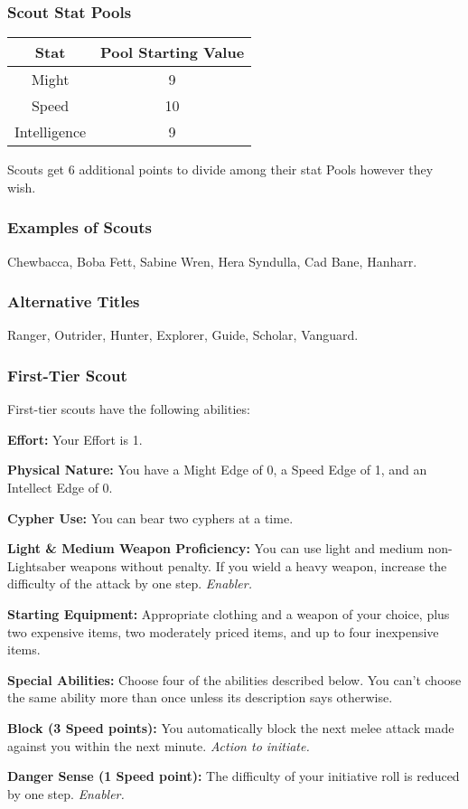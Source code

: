 \documentclass[a4paper,10pt,final,twocolumn,oneside]{book}
\newcommand{\statPool}[5]
{
	\subsubsection*{#1 Stat Pools}
	\label{subsub:#1StatPools}
	\begin{center}
	\begin{tabular}{ |c|c| }
	\hline
	\textbf{Stat} & \textbf{Pool Starting Value} \\
	\hline \hline
	Might & #2 \\
	\hline
 	Speed & #3  \\
 	\hline
 	Intelligence & #4  \\
 	\hline
	\end{tabular}
	\end{center}
	#1s get #5 additional points to divide among their stat Pools however they wish.
}
\newcommand{\itemLine}[2]{\textbf{#1:}{ #2}\par}
\newcommand{\itemAbility}[2]{\textcolor{25gray}{\textbullet\textbf{ #1:}}{ #2}\par}
\newcommand{\enabler}{\textit{ Enabler.}}
\newcommand{\actionInit}{\textit{ Action to initiate.}}
\begin{document}
\statPool{Scout}{9}{10}{9}{6}

\subsubsection*{Examples of Scouts}
\label{subsub:scoutExamples}

Chewbacca, Boba Fett, Sabine Wren, Hera Syndulla, Cad Bane, Hanharr.

\subsubsection*{Alternative Titles}
\label{subsub:scoutAlternative}

Ranger, Outrider, Hunter, Explorer, Guide, Scholar, Vanguard.


\subsubsection*{First-Tier Scout}
\label{subsub:scoutFirstTier}

First-tier scouts have the following abilities: \par

\itemLine{Effort}{Your Effort is 1.}

\itemLine{Physical Nature}{You have a Might Edge of 0, a Speed Edge of 1, and an Intellect Edge of 0.}

\itemLine{Cypher Use}{You can bear two cyphers at a time.}

\itemLine{Light \& Medium Weapon Proficiency}{You can use light and medium non-Lightsaber weapons without penalty. If you wield a heavy weapon, increase the difficulty of the attack by one step.\enabler}

\itemLine{Starting Equipment}{Appropriate clothing and a weapon of your choice, plus two expensive items, two moderately priced items, and up to four inexpensive items.}

\itemLine{Special Abilities}{Choose four of the abilities described below. You can’t choose the same ability more than once unless its description says otherwise.}

\itemAbility{Block (3 Speed points)}{You automatically block the next melee attack made against you within the next minute.\actionInit}

\itemAbility{Danger Sense (1 Speed point)}{The difficulty of your initiative roll is reduced by one step.\enabler}
\end{document}

